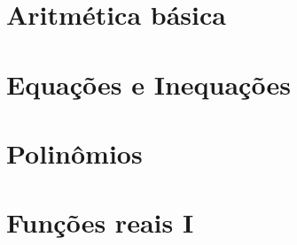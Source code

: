 \documentclass[
	12pt, %
	a4paper, %
	oneside, %
]{LegrandOrangeBook}
\let\cleardoublepage\clearpage
\begin{document}


\pagestyle{fancy} %




\chapterspaceabove{6.75cm} %
\chapterspacebelow{7.25cm} %


 \part{Aritmética básica}
 
 


%

 \part{Equações e Inequações}



%

\part{Polinômios}




\part{Funções reais I}




\end{document}
